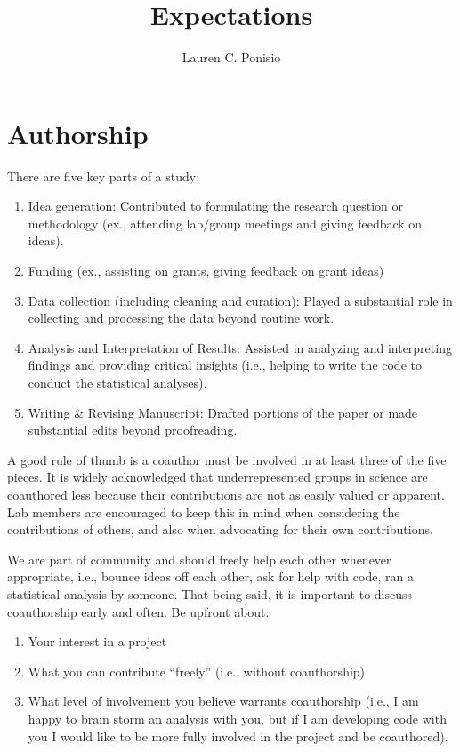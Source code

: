 \documentclass[12pt]{article}
\title{Expectations}
\author{Lauren C. Ponisio}
\begin{document}
\maketitle

\section{Authorship}
There are five key parts of a study:
\begin{enumerate}
\item Idea generation: Contributed to formulating the research
  question or methodology (ex., attending lab/group meetings and
  giving feedback on ideas).
\item Funding (ex., assisting on grants, giving feedback on grant ideas)
\item Data collection (including cleaning and curation): Played a
  substantial role in collecting and processing the data beyond
  routine work.
\item Analysis and Interpretation of Results: Assisted in analyzing
  and interpreting findings and providing critical insights (i.e.,
  helping to write the code to conduct the statistical analyses). 
\item Writing \& Revising Manuscript: Drafted portions of the paper or
  made substantial edits beyond proofreading.
\end{enumerate}

A good rule of thumb is a coauthor must be involved in at least three
of the five pieces. It is widely acknowledged that underrepresented
groups in science are coauthored less because their contributions are
not as easily valued or apparent. Lab members are encouraged to keep
this in mind when considering the contributions of others, and also
when advocating for their own contributions. 

We are part of community and should freely help each other whenever
appropriate, i.e., bounce ideas off each other, ask for help with
code, ran a statistical analysis by someone. That being said, it is
important to discuss coauthorship early and often. Be upfront about:

\begin{enumerate}
\item Your interest in a project
\item What you can contribute ``freely'' (i.e., without coauthorship)
\item What level of involvement you believe warrants coauthorship
  (i.e., I am happy to brain storm an analysis with you, but if I am
  developing code with you I would like to be more fully involved in
  the project and be coauthored). 
\end{enumerate}
\end{document}
